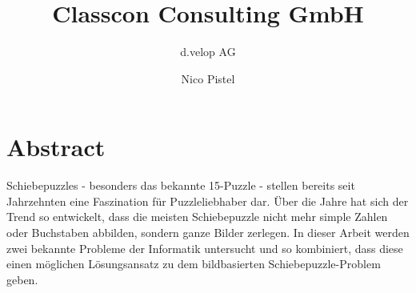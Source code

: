 \documentclass{whswinvcbook}
\title[Bericht]{Classcon Consulting GmbH}
\subtitle{d.velop AG}
\author[Nico Pistel]{Nico Pistel}
\begin{document}
%
\frontmatter


\cleardoublepage
\chapter*{Abstract}
Schiebepuzzles - besonders das bekannte 15-Puzzle - stellen bereits seit Jahrzehnten eine Faszination für Puzzleliebhaber dar. Über die Jahre hat sich der Trend so entwickelt, dass die meisten Schiebepuzzle nicht mehr simple Zahlen oder Buchstaben abbilden, sondern ganze Bilder zerlegen. In dieser Arbeit werden zwei bekannte Probleme der Informatik untersucht und so kombiniert, dass diese einen möglichen Lösungsansatz zu dem bildbasierten Schiebepuzzle-Problem geben.

\tableofs
\lstlistoflistings
\listofalgorithms

\mainmatter
\end{document}
